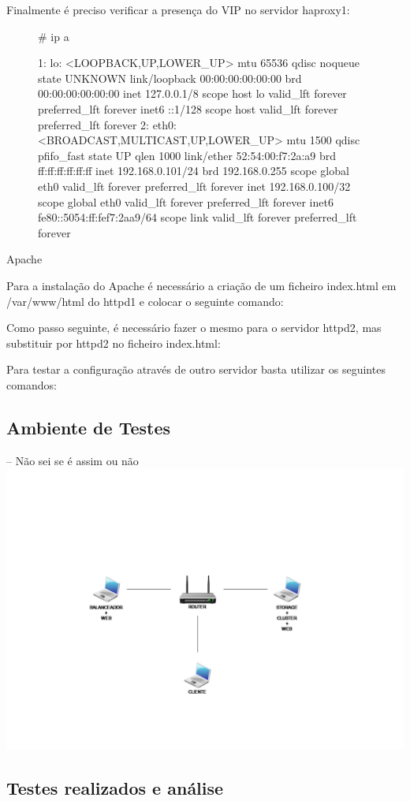 Finalmente é preciso verificar a presença do VIP no servidor haproxy1:


\begin{figure}[!h]
\begin{MyVerbatim}
# ip a

1: lo: <LOOPBACK,UP,LOWER_UP> mtu 65536 qdisc noqueue state UNKNOWN
link/loopback 00:00:00:00:00:00 brd 00:00:00:00:00:00
inet 127.0.0.1/8 scope host lo
valid_lft forever preferred_lft forever
inet6 ::1/128 scope host
valid_lft forever preferred_lft forever
2: eth0: <BROADCAST,MULTICAST,UP,LOWER_UP> mtu 1500 qdisc pfifo_fast state UP qlen 1000
link/ether 52:54:00:f7:2a:a9 brd ff:ff:ff:ff:ff:ff
inet 192.168.0.101/24 brd 192.168.0.255 scope global eth0
valid_lft forever preferred_lft forever
inet 192.168.0.100/32 scope global eth0
valid_lft forever preferred_lft forever
inet6 fe80::5054:ff:fef7:2aa9/64 scope link
valid_lft forever preferred_lft forever
\end{MyVerbatim}
\end{figure}

Apache

Para a instalação do Apache é necessário a criação de um ficheiro index.html em /var/www/html do httpd1 e colocar o seguinte comando:
 \par

Como passo seguinte, é necessário fazer o mesmo para o servidor httpd2, mas substituir por httpd2 no ficheiro index.html:
 \par

Para testar a configuração através de outro servidor basta utilizar os seguintes comandos:
 \par
{} \par

\subsection{Ambiente de Testes}

-- Não sei se é assim ou não
\includegraphics[scale=.4]{img/AmbienteDeTestes}

\subsection{Testes realizados e análise}

